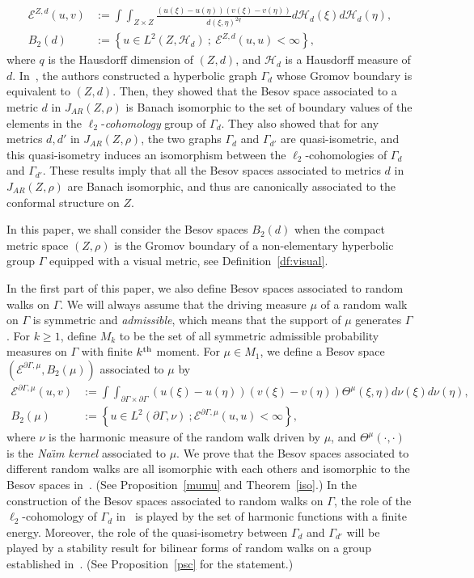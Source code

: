 \documentclass[10pt]{amsart}
\theoremstyle{definition}\newtheorem{defi}[theo]{Definition}\newtheorem{rema}[theo]{Remark}\newtheorem{exam}[theo]{Example}\newtheorem{exem}[theo]{Example}\newtheorem{nota}[theo]{Notation}
\newcommand{\ce}{\mathcal{E}}
\newcommand{\ch}{\mathcal{H}}
\begin{document}
\begin{align*}
\ce^{Z,d}(u,v)&:=\int\int_{Z\times Z}\frac{(u(\xi)-u(\eta))(v(\xi)-v(\eta))}{d(\xi,\eta)^{2q}} d\ch_{d}(\xi)d\ch_{d}(\eta),\\
B_2(d)&:=\left\{u\in L^2(Z,\ch_{d})\ ;\ \ce^{Z,d}(u,u)<\infty\right\},
\end{align*}
where $q$ is the Hausdorff dimension of $(Z,d)$, and $\ch_{d}$ is a Hausdorff measure of $d$. In~\cite{BP}, the authors constructed a hyperbolic graph $\Gamma_{d}$ whose Gromov boundary is equivalent to $(Z,d)$. Then, they showed that the Besov space associated to a metric $d$ in $J_{AR}(Z,\rho)$ is Banach isomorphic to the set of boundary values of the elements in the $\ell_2$-\emph{cohomology} group of $\Gamma_{d}$. They also showed that for any metrics $d,d'$ in $J_{AR}(Z,\rho)$, the two graphs $\Gamma_{d}$ and $\Gamma_{d'}$ are quasi-isometric, and this quasi-isometry induces an isomorphism between the $\ell_2$-cohomologies of $\Gamma_{d}$ and $\Gamma_{d'}$. These results imply that all the Besov spaces associated to metrics $d$ in $J_{AR}(Z,\rho)$ are Banach isomorphic, and thus are canonically associated to the conformal structure on $Z$.



In this paper, we shall consider the Besov spaces $B_2(d)$ when the compact metric space $(Z,\rho)$ is the Gromov boundary of a non-elementary hyperbolic group $\Gamma$ equipped with a visual metric, see Definition~\ref{df:visual}.


In the first part of this paper, we also define Besov spaces associated to random walks on $\Gamma$. We will always assume that the driving measure $\mu$ of a random walk on $\Gamma$ is symmetric and \emph{admissible}, which means that the support of $\mu$ generates $\Gamma$. For $k\geq1$, define $M_k$ to be the set of all symmetric admissible probability measures on $\Gamma$ with finite $k^{\rm th}$ moment. For $\mu\in M_1$, we define a Besov space $(\ce^{\partial\Gamma,\mu},B_2(\mu))$ associated to $\mu$ by
\begin{align*}
\ce^{\partial\Gamma,\mu}(u,v)&:=\int\int_{\partial\Gamma\times \partial\Gamma} (u(\xi)-u(\eta))(v(\xi)-v(\eta)) \Theta^\mu(\xi,\eta) d\nu(\xi)d\nu(\eta),\\
B_2(\mu)&:=\left\{u\in L^2(\partial\Gamma,\nu)\ ;\ce^{\partial\Gamma,\mu}(u,u)<\infty\right\},
\end{align*}
where $\nu$ is the harmonic measure of the random walk driven by $\mu$, and $\Theta^\mu(\cdot,\cdot)$ is the \emph{Na{\"\i}m kernel} associated to $\mu$. We prove that the Besov spaces associated to different random walks are all isomorphic with each others and isomorphic to the Besov spaces in~\cite{BP}. (See Proposition~\ref{mumu} and Theorem~\ref{iso}.) In the construction of the Besov spaces associated to random walks on $\Gamma$, the role of the $\ell_2$-cohomology of $\Gamma_{d}$ in~\cite{BP} is played by the set of harmonic functions with a finite energy. Moreover, the role of the quasi-isometry between $\Gamma_{d}$ and $\Gamma_{d'}$ will be played by a stability result for bilinear forms of random walks on a group established in~\cite{PSC}. (See Proposition~\ref{psc} for the statement.)
\end{document}
